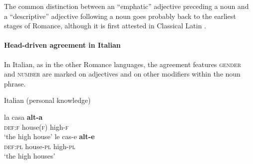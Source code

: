 The common distinction between an “emphatic” adjective preceding a noun and a “descriptive” adjective following a noun goes probably back to the earliest stages of Romance, although it is first attested in Classical Latin \citep[146]{posner1996}.

\paragraph*{Head\hyp{}driven agreement in Italian} 
In Italian, as in the other Romance languages, the agreement features \textsc{gender} and \textsc{number} are marked on adjectives and on other modifiers within the noun phrase.
\begin{exe}
\ex \rm{Italian (personal knowledge)}
\begin{xlist}
\ex
\gll	la casa \textbf{alt-a}\\
	\textsc{def:f} house(\textsc{f}) high-\textsc{f}\\
\glt	‘the high house’
\ex
\gll	le cas-e \textbf{alt-e}\\
	\textsc{def:pl} house-\textsc{pl} high-\textsc{pl}\\
\glt	‘the high houses’
\end{xlist}
\end{exe}

